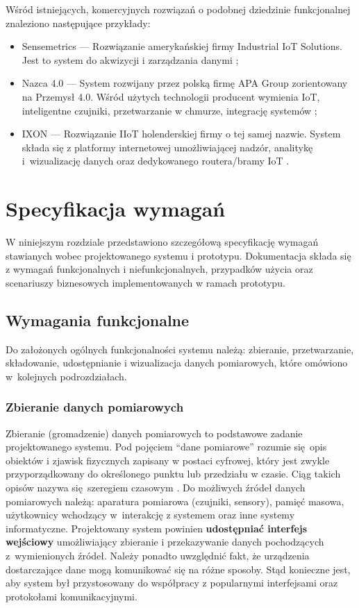 \documentclass[a4paper, 12pt, twoside]{article}
\begin{document}
Wśród istniejących, komercyjnych rozwiązań o podobnej dziedzinie funkcjonalnej
znaleziono następujące przykłady:
\begin{itemize}
      \itemsep0em
      \item Sensemetrics --- Rozwiązanie amerykańskiej firmy Industrial IoT Solutions.
            Jest to system do akwizycji i zarządzania danymi \cite{sensmetrics};
      \item Nazca 4.0 --- System rozwijany przez polską firmę APA Group zorientowany na Przemysł 4.0.
            Wśród użytych technologii producent wymienia IoT, inteligentne czujniki,
            przetwarzanie w chmurze, integrację systemów \cite{nazca};
      \item IXON --- Rozwiązanie IIoT holenderskiej firmy o tej samej nazwie.
            System składa się z platformy internetowej umożliwiającej nadzór, analitykę i~wizualizację danych oraz
            dedykowanego routera/bramy IoT \cite{ixon}.
\end{itemize}



\section{Specyfikacja wymagań}\label{wymagania}

W niniejszym rozdziale przedstawiono szczegółową specyfikację wymagań
stawianych wobec projektowanego systemu i prototypu. Dokumentacja składa się
z wymagań funkcjonalnych i niefunkcjonalnych, przypadków użycia oraz scenariuszy
biznesowych implementowanych w ramach prototypu.

\subsection{Wymagania funkcjonalne}

Do założonych ogólnych funkcjonalności systemu należą: zbieranie, przetwarzanie,
składowanie, udostępnianie i wizualizacja danych pomiarowych, które omówiono
w~kolejnych podrozdziałach.

\subsubsection{Zbieranie danych pomiarowych}

Zbieranie (gromadzenie) danych pomiarowych to podstawowe zadanie projektowanego systemu.
Pod pojęciem ``dane pomiarowe'' rozumie się opis obiektów i zjawisk fizycznych
zapisany w postaci cyfrowej, który jest zwykle przyporządkowany do określonego
punktu lub przedziału w czasie. Ciąg takich opisów nazywa się szeregiem czasowym \cite{time-series}.
Do możliwych źródeł danych pomiarowych należą: aparatura pomiarowa (czujniki, sensory),
pamięć masowa, użytkownicy wchodzący w~interakcję z systemem oraz inne systemy informatyczne.
Projektowany system powinien \textbf{udostępniać interfejs wejściowy} umożliwiający zbieranie
i przekazywanie danych pochodzących z~wymienionych źródeł. Należy ponadto uwzględnić
fakt, że urządzenia dostarczające dane mogą komunikować się na różne sposoby.
Stąd konieczne jest, aby system był przystosowany do współpracy z popularnymi
interfejsami oraz protokołami komunikacyjnymi.
\end{document}
